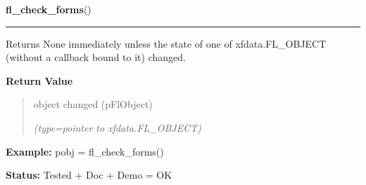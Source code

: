     \label{xformslib:flbasic:fl_check_forms}

    \vspace{0.5ex}

\hspace{.8\funcindent}\begin{boxedminipage}{\funcwidth}

    \raggedright \textbf{fl\_check\_forms}()

    \vspace{-1.5ex}

    \rule{\textwidth}{0.5\fboxrule}
\setlength{\parskip}{2ex}
    Returns None immediately unless the state of one of xfdata.FL\_OBJECT 
    (without a callback bound to it) changed.

\setlength{\parskip}{1ex}
      \textbf{Return Value}
    \vspace{-1ex}

      \begin{quote}
      object changed (pFlObject)

      {\it (type=pointer to xfdata.FL\_OBJECT)}

      \end{quote}

\textbf{Example:} pobj = fl\_check\_forms()



\textbf{Status:} Tested + Doc + Demo = OK



    \end{boxedminipage}

    \label{xformslib:flbasic:fl_do_only_forms}

    \vspace{0.5ex}

